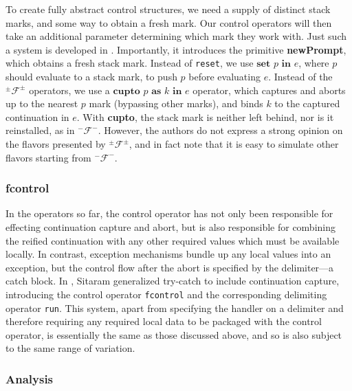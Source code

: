 \documentclass[11pt]{article}
\newcommand{\maybePage}{\newpage}
\newcommand\F{\mathcal{F}}
\newcommand\pmFpm{^\pm\F^\pm}
\begin{document}
To create fully abstract control structures, we need a supply of distinct stack marks, and some way to obtain a fresh mark.
Our control operators will then take an additional parameter determining which mark they work with.
Just such a system is developed in \cite{Gunter:1995}.
Importantly, it introduces the primitive \textbf{newPrompt}, which obtains a fresh stack mark.
Instead of \texttt{reset}, we use $\textbf{set }p\textbf{ in }e$, where $p$ should evaluate to a stack mark, to push $p$ before evaluating $e$.
Instead of the $\pmFpm$ operators, we use a $\textbf{cupto }p\textbf{ as }k\textbf{ in }e$ operator, which captures and aborts up to the nearest $p$ mark (bypassing other marks), and binds $k$ to the captured continuation in $e$.
With \textbf{cupto}, the stack mark is neither left behind, nor is it reinstalled, as in $^-\mathcal{F}^-$.
However, the authors do not express a strong opinion on the flavors presented by $\pmFpm$, and in fact note that it is easy to simulate other flavors starting from $^-\mathcal{F}^-$.

\maybePage
\subsubsection{fcontrol}

In the operators so far, the control operator has not only been responsible for effecting continuation capture and abort, but is also responsible for combining the reified continuation with any other required values which must be available locally.
In contrast, exception mechanisms bundle up any local values into an exception, but the control flow after the abort is specified by the delimiter---a catch block.
In \cite{HandlingControl}, Sitaram generalized try-catch to include continuation capture, introducing the control operator \texttt{fcontrol} and the corresponding delimiting operator \texttt{run}.
This system, apart from specifying the handler on a delimiter and therefore requiring any required local data to be packaged with the control operator, is essentially the same as those discussed above, and so is also subject to the same range of variation.

\maybePage
\subsubsection{Analysis}
\label{subsubsec:delimControlAnalysis}
\end{document}
